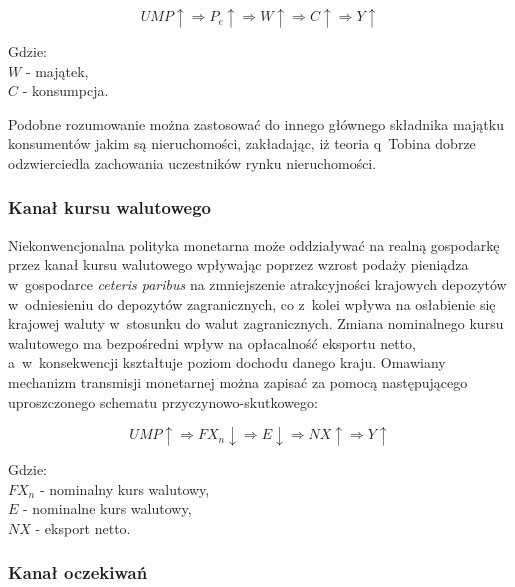 \begin{equation}
UMP\uparrow \Longrightarrow P_e\uparrow \Longrightarrow W\uparrow \Longrightarrow C\uparrow \Longrightarrow Y\uparrow	
\end{equation}
\vspace{-1cm}
\begin{adjustwidth}{2.5em}{0pt}
{\footnotesize Gdzie: \\
$W$ - majątek,\\
$C$ - konsumpcja.}
\end{adjustwidth}
\vspace{0.3cm}

\noindent Podobne rozumowanie można zastosować do innego głównego składnika majątku konsumentów jakim są nieruchomości, zakładając, iż teoria q~Tobina dobrze odzwierciedla zachowania uczestników rynku nieruchomości.

\subsubsection*{\normalsize{Kanał kursu walutowego}}

Niekonwencjonalna polityka monetarna może oddziaływać na realną gospodarkę przez kanał kursu walutowego wpływając poprzez wzrost podaży pieniądza w~gospodarce \textit{ceteris paribus} na zmniejszenie atrakcyjności krajowych depozytów w~odniesieniu do depozytów zagranicznych, co z~kolei wpływa na osłabienie się krajowej waluty w~stosunku do walut zagranicznych. Zmiana nominalnego kursu walutowego ma bezpośredni wpływ na opłacalność eksportu netto, a~w~konsekwencji kształtuje poziom dochodu danego kraju. Omawiany mechanizm transmisji monetarnej można zapisać za pomocą następującego uproszczonego schematu przyczynowo-skutkowego:

\begin{equation}
UMP\uparrow \Longrightarrow FX_n\downarrow \Longrightarrow E\downarrow \Longrightarrow NX\uparrow \Longrightarrow Y\uparrow	
\end{equation}
\vspace{-1cm}
\begin{adjustwidth}{2.5em}{0pt}
{\footnotesize Gdzie: \\
$FX_n$ - nominalny kurs walutowy,\\
$E$ - nominalne kurs walutowy,\\
$NX$ - eksport netto.}
\end{adjustwidth}
\vspace{0.3cm}

\subsubsection*{\normalsize{Kanał oczekiwań}}

